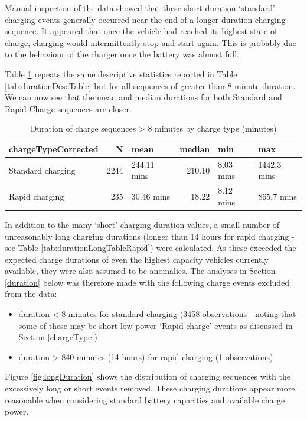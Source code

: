 \documentclass[]{article}
\providecommand{\tightlist}{%
  \setlength{\itemsep}{0pt}\setlength{\parskip}{0pt}}
\begin{document}
Manual inspection of the data showed that these short-duration `standard' charging events generally occurred near the end of a longer-duration charging sequence. It appeared that once the vehicle had reached its highest state of charge, charging would intermittently stop and start again. This is probably due to the behaviour of the charger once the battery was almost full.

Table \ref{tab:durationDescTableReduced} repeats the same descriptive statistics reported in Table \ref{tab:durationDescTable} but for all sequences of greater than 8 minute duration. We can now see that the mean and median durations for both Standard and Rapid Charge sequences are closer.

\begin{table}[t]

\caption{\label{tab:durationDescTableReduced}Duration of charge sequences > 8 minutes by charge type (minutes)}
\centering
\begin{tabular}{l|r|l|r|l|l}
\hline
chargeTypeCorrected & N & mean & median & min & max\\
\hline
Standard charging & 2244 & 244.11 mins & 210.10 & 8.03 mins & 1442.3 mins\\
\hline
Rapid charging & 235 & 30.46 mins & 18.22 & 8.12 mins & 865.7 mins\\
\hline
\end{tabular}
\end{table}

In addition to the many `short' charging duration values, a small number of unreasonably long charging durations (longer than 14 hours for rapid charging - see Table \ref{tab:durationLongTableRapid}) were calculated. As these exceeded the expected charge durations of even the highest capacity vehicles currently available, they were also assumed to be anomalies. The analyses in Section \ref{duration} below was therefore made with the following charge events excluded from the data:

\begin{itemize}
\tightlist
\item
  duration \textless{} 8 minutes for standard charging (3458 observations - noting that some of these may be short low power `Rapid charge' events as discussed in Section \ref{chargeType})
\item
  duration \textgreater{} 840 minutes (14 hours) for rapid charging (1 observations)
\end{itemize}

Figure \ref{fig:longDuration} shows the distribution of charging sequences with the excessively long or short events removed. These charging durations appear more reasonable when considering standard battery capacities and available charge power.
\end{document}

